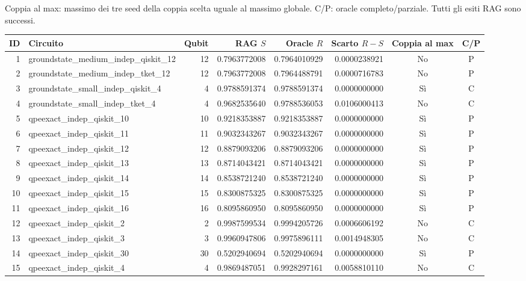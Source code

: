 \documentclass[10pt,a4paper,landscape]{article}
\begin{document}
\small Coppia al max: massimo dei tre seed della coppia scelta uguale al massimo globale.
C/P: oracle completo/parziale. Tutti gli esiti RAG sono successi.
\par\vspace{2mm}
{\fontsize{8.5}{10}\selectfont\setlength{\tabcolsep}{5pt}\renewcommand{\arraystretch}{1.18}

\begin{tabular}{rlrrrrcc}
\toprule
ID & Circuito & Qubit & RAG $S$ & Oracle $R$ & Scarto $R-S$ & Coppia al max & C/P \\
\midrule
1 & groundstate\_medium\_indep\_qiskit\_12 & 12 & 0.7963772008 & 0.7964010929 & 0.0000238921 & No & P \\
2 & groundstate\_medium\_indep\_tket\_12 & 12 & 0.7963772008 & 0.7964488791 & 0.0000716783 & No & P \\
3 & groundstate\_small\_indep\_qiskit\_4 & 4 & 0.9788591374 & 0.9788591374 & 0.0000000000 & Sì & C \\
4 & groundstate\_small\_indep\_tket\_4 & 4 & 0.9682535640 & 0.9788536053 & 0.0106000413 & No & C \\
5 & qpeexact\_indep\_qiskit\_10 & 10 & 0.9218353887 & 0.9218353887 & 0.0000000000 & Sì & P \\
6 & qpeexact\_indep\_qiskit\_11 & 11 & 0.9032343267 & 0.9032343267 & 0.0000000000 & Sì & P \\
7 & qpeexact\_indep\_qiskit\_12 & 12 & 0.8879093206 & 0.8879093206 & 0.0000000000 & Sì & P \\
8 & qpeexact\_indep\_qiskit\_13 & 13 & 0.8714043421 & 0.8714043421 & 0.0000000000 & Sì & P \\
9 & qpeexact\_indep\_qiskit\_14 & 14 & 0.8538721240 & 0.8538721240 & 0.0000000000 & Sì & P \\
10 & qpeexact\_indep\_qiskit\_15 & 15 & 0.8300875325 & 0.8300875325 & 0.0000000000 & Sì & P \\
11 & qpeexact\_indep\_qiskit\_16 & 16 & 0.8095860950 & 0.8095860950 & 0.0000000000 & Sì & P \\
12 & qpeexact\_indep\_qiskit\_2 & 2 & 0.9987599534 & 0.9994205726 & 0.0006606192 & No & C \\
13 & qpeexact\_indep\_qiskit\_3 & 3 & 0.9960947806 & 0.9975896111 & 0.0014948305 & No & C \\
14 & qpeexact\_indep\_qiskit\_30 & 30 & 0.5202940694 & 0.5202940694 & 0.0000000000 & Sì & P \\
15 & qpeexact\_indep\_qiskit\_4 & 4 & 0.9869487051 & 0.9928297161 & 0.0058810110 & No & C \\

\end{tabular}}
\end{document}

